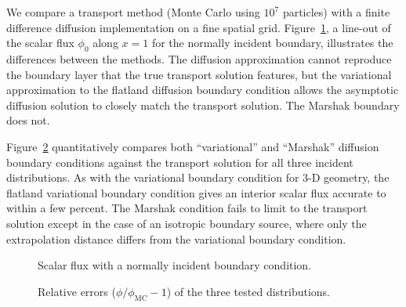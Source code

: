 \documentclass{anstrans}
\begin{document}
We compare a transport method (Monte Carlo using $10^7$ particles)
with a finite difference diffusion implementation on a fine spatial grid.
Figure~\ref{fig:delta},
 a line-out of the scalar flux $\phi_0$ along
$x=1$ for the normally incident boundary, illustrates the differences between
the methods. The diffusion
approximation cannot reproduce the boundary layer that the true transport
solution features, but the variational approximation to the flatland
diffusion boundary condition allows the asymptotic diffusion solution to
closely match the transport solution. The Marshak boundary does not.

Figure~\ref{fig:relative} quantitatively compares both ``variational'' and
``Marshak'' diffusion boundary conditions against the transport solution
for all three incident distributions.  
As with the variational boundary condition for 3-D geometry, the flatland
variational boundary condition gives an interior scalar flux accurate to within
a few percent. The Marshak condition fails to limit to the transport solution except in
the case of an isotropic boundary source, where only the extrapolation
distance differs from the variational boundary condition.


%

%  

\begin{figure}[tb]
  \centering
  \hspace{-.5in}
  
  \hspace{-.5in}
  \caption{Scalar flux with a normally incident boundary condition.}
  \label{fig:delta}
\end{figure}

%  
%
\begin{figure}[tb]
  \centering
  \hspace{-.5in}
  
  \hspace{-.5in}
  \caption{Relative errors ($\phi/\phi_\text{MC} - 1$) of the three tested
  distributions.}
  \label{fig:relative}
\end{figure}
\end{document}
